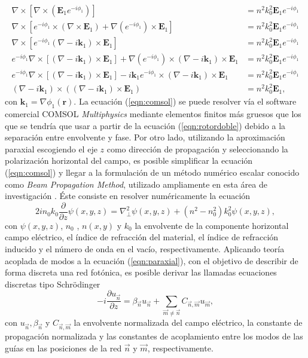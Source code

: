 \documentclass{article}
\begin{document}
\begin{align}
\nabla\times[\nabla\times(\textbf{E}_1 e^{-i \phi_1 })] &=  n^2k_0^2 \textbf{E}_1 e^{-i \phi_1}
\\
\nabla\times[ e^{-i \phi_1} \times (\nabla \times \textbf{E}_1) + \nabla(e^{-i \phi_1})\times \textbf{E}_1] &=  n^2k_0^2 \textbf{E}_1 e^{-i \phi_1}
\\
\nabla\times[ e^{-i \phi_1}  (\nabla  - i  \textbf{k} _1)\times\textbf{E}_1  ] &=  n^2k_0^2 \textbf{E}_1 e^{-i \phi_1}
\\
e^{-i \phi_1}  \nabla\times[ (\nabla  - i  \textbf{k} _1)\times\textbf{E}_1] + \nabla(e^{-i \phi_1})\times  (\nabla  - i  \textbf{k} _1)\times\textbf{E}_1  &=  n^2k_0^2 \textbf{E}_1 e^{-i \phi_1}
\\
e^{-i \phi_1}  \nabla\times[ (\nabla  - i  \textbf{k} _1)\times\textbf{E}_1] - i\textbf{k}_1 e^{-i \phi_1}\times  (\nabla  - i  \textbf{k} _1)\times\textbf{E}_1  &=  n^2k_0^2 \textbf{E}_1 e^{-i \phi_1}
\\
	(\nabla-i\textbf{k}_1)\times((\nabla-i\textbf{k}_1)\times \textbf{E}_1) &= n^2k_0^2 \textbf{E}_1,
	 \label{eqn:comsol}
\end{align}
con $\textbf{k}_1 = \nabla\phi_1(\textbf{r})$.
La ecuación (\ref{eqn:comsol}) se puede resolver vía el software comercial COMSOL \textit{Multiphysics} mediante elementos finitos más gruesos que los que se tendría que usar a partir de la ecuación (\ref{eqn:rotordoble}) debido a la separación entre envolvente y fase. Por otro lado, utilizando la aproximación paraxial escogiendo el eje $z$  como dirección de propagación y seleccionando la polarización horizontal del campo, es posible simplificar la ecuación (\ref{eqn:comsol}) y llegar a la formulación de un método numérico escalar conocido como \textit{Beam Propagation Method}, utilizado ampliamente en esta área de investigación \cite{bics, interorbital, OAMCaging, vortex, bpm}. Éste consiste en resolver numéricamente la ecuación
\begin{equation}
	2in_0k_0\frac{\partial}{\partial z}\psi(x,y,z) = \nabla_\perp^2 \psi (x,y,z) + \left(n^2-n_0^2\right)k_0^2 \psi (x,y,z), \label{eqn:paraxial}
\end{equation}
con $\psi(x,y,z)$, $n_0$ , $n(x,y)$ y $k_0$ la envolvente de la componente horizontal campo eléctrico, el índice de refracción del material, el índice de refracción inducido y el número de onda en el vacío, respectivamente. Aplicando teoría acoplada de modos \cite{coupledmodetheory} a la ecuación (\ref{eqn:paraxial}), con el objetivo de describir de forma discreta una red fotónica, es posible derivar las llamadas ecuaciones discretas tipo Schrödinger \cite{discretesolitons, artificialFB, FBdynamics}
\begin{equation}
	-i\frac{\partial u_{\vec{n}} }{\partial z} = \beta_{\vec{n}}u_{\vec{n}} + \sum_{\vec{m}\neq\vec{n}} C_{\vec{n},\vec{m}}u_{\vec{m}}, \label{eqn:CMT}
\end{equation}
con $u_{\vec{n}}, \beta_{\vec{n}}$ y $C_{\vec{n}, \vec{m}}$ la envolvente normalizada del campo eléctrico, la constante de propagación normalizada y las constantes de acoplamiento entre los modos de las guías en las posiciones de la red $\vec{n}$ y $\vec{m}$, respectivamente.
\end{document}
